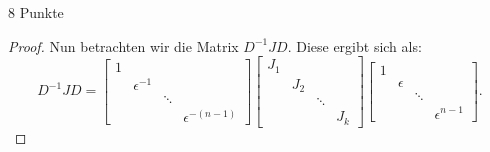 \documentclass{problemset}
\begin{document}
\begin{problem}{8 Punkte}
\begin{proof}
    Nun betrachten wir die Matrix \( D^{-1} J D \). Diese ergibt sich als:
    \[
        D^{-1} J D =
        \begin{bmatrix}
            1 &               &        &                   \\
              & \epsilon^{-1} &        &                   \\
              &               & \ddots &                   \\
              &               &        & \epsilon^{-(n-1)}
        \end{bmatrix}
        \begin{bmatrix}
            J_1 &     &        &     \\
                & J_2 &        &     \\
                &     & \ddots &     \\
                &     &        & J_k
        \end{bmatrix}
        \begin{bmatrix}
            1 &          &        &                \\
              & \epsilon &        &                \\
              &          & \ddots &                \\
              &          &        & \epsilon^{n-1}
        \end{bmatrix}.
    \]


\end{proof}
\end{problem}
\end{document}
